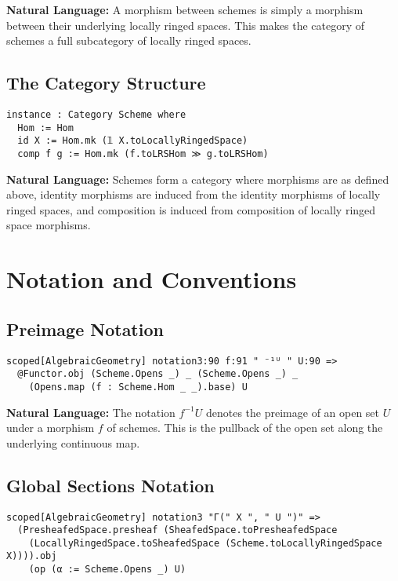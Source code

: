 \documentclass{article}
\theoremstyle{definition}
\begin{document}
\textbf{Natural Language:} A morphism between schemes is simply a morphism between their underlying locally ringed spaces. This makes the category of schemes a full subcategory of locally ringed spaces.

\subsection{The Category Structure}

\begin{lstlisting}
instance : Category Scheme where
  Hom := Hom
  id X := Hom.mk (𝟙 X.toLocallyRingedSpace)
  comp f g := Hom.mk (f.toLRSHom ≫ g.toLRSHom)
\end{lstlisting}

\textbf{Natural Language:} Schemes form a category where morphisms are as defined above, identity morphisms are induced from the identity morphisms of locally ringed spaces, and composition is induced from composition of locally ringed space morphisms.

\section{Notation and Conventions}

\subsection{Preimage Notation}

\begin{lstlisting}
scoped[AlgebraicGeometry] notation3:90 f:91 " ⁻¹ᵁ " U:90 =>
  @Functor.obj (Scheme.Opens _) _ (Scheme.Opens _) _
    (Opens.map (f : Scheme.Hom _ _).base) U
\end{lstlisting}

\textbf{Natural Language:} The notation $f^{-1}U$ denotes the preimage of an open set $U$ under a morphism $f$ of schemes. This is the pullback of the open set along the underlying continuous map.

\subsection{Global Sections Notation}

\begin{lstlisting}
scoped[AlgebraicGeometry] notation3 "Γ(" X ", " U ")" =>
  (PresheafedSpace.presheaf (SheafedSpace.toPresheafedSpace
    (LocallyRingedSpace.toSheafedSpace (Scheme.toLocallyRingedSpace X)))).obj
    (op (α := Scheme.Opens _) U)
\end{lstlisting}
\end{document}
